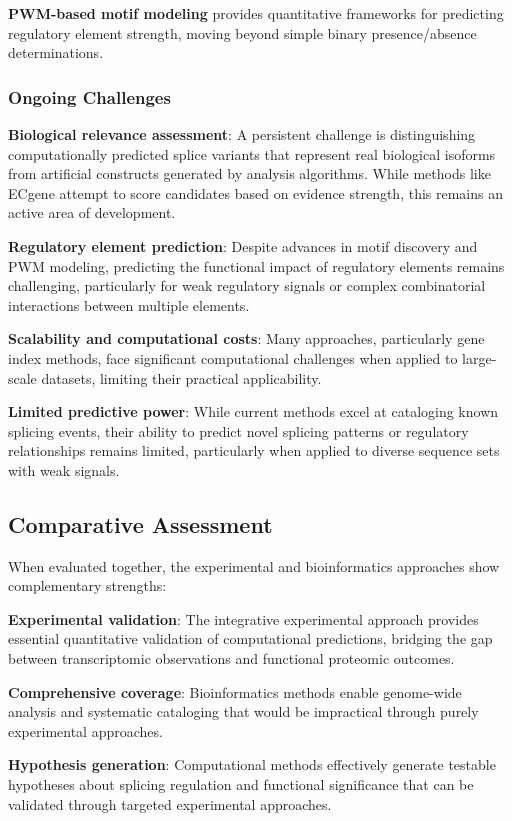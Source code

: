 \documentclass[12pt,a4paper]{article}
\begin{document}
\textbf{PWM-based motif modeling} provides quantitative frameworks for predicting regulatory element strength, moving beyond simple binary presence/absence determinations.

\subsubsection{Ongoing Challenges}

\textbf{Biological relevance assessment}: A persistent challenge is distinguishing computationally predicted splice variants that represent real biological isoforms from artificial constructs generated by analysis algorithms. While methods like ECgene attempt to score candidates based on evidence strength, this remains an active area of development.

\textbf{Regulatory element prediction}: Despite advances in motif discovery and PWM modeling, predicting the functional impact of regulatory elements remains challenging, particularly for weak regulatory signals or complex combinatorial interactions between multiple elements.

\textbf{Scalability and computational costs}: Many approaches, particularly gene index methods, face significant computational challenges when applied to large-scale datasets, limiting their practical applicability.

\textbf{Limited predictive power}: While current methods excel at cataloging known splicing events, their ability to predict novel splicing patterns or regulatory relationships remains limited, particularly when applied to diverse sequence sets with weak signals.

\subsection{Comparative Assessment}

When evaluated together, the experimental and bioinformatics approaches show complementary strengths:

\textbf{Experimental validation}: The integrative experimental approach provides essential quantitative validation of computational predictions, bridging the gap between transcriptomic observations and functional proteomic outcomes.

\textbf{Comprehensive coverage}: Bioinformatics methods enable genome-wide analysis and systematic cataloging that would be impractical through purely experimental approaches.

\textbf{Hypothesis generation}: Computational methods effectively generate testable hypotheses about splicing regulation and functional significance that can be validated through targeted experimental approaches.
\end{document}

